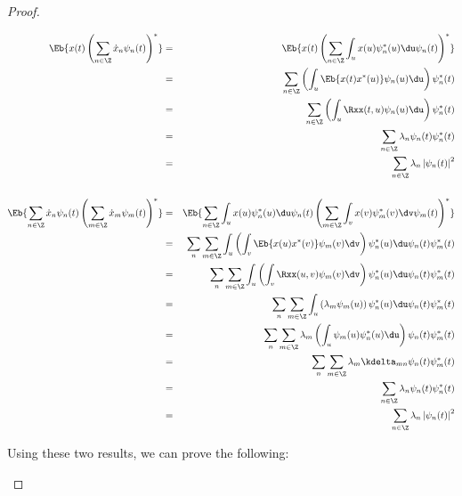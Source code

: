 \begin{proof}
\begin{enumerate}
\begin{eqnarray*}
   \Eb{x(t) \left(\sum_{n\in\Z}\dot{x}_n \psi_n(t)\right)^\ast}
     &=& \Eb{x(t) \left(\sum_{n\in\Z}\int_u x(u)\psi_n^\ast(u)\du \psi_n(t)\right)^\ast}
   \\&=&  \sum_{n\in\Z}\left(\int_u \Eb{x(t)x^\ast(u)}\psi_n(u)\du\right) \psi_n^\ast(t)
   \\&=&  \sum_{n\in\Z}\left(\int_u \Rxx(t,u)\psi_n(u)\du\right) \psi_n^\ast(t)
   \\&=&  \sum_{n\in\Z}\lambda_n\psi_n(t) \psi_n^\ast(t)
   \\&=&  \sum_{n\in\Z}\lambda_n \left|\psi_n(t) \right|^2
\\ \\
   \Eb{\sum_{n\in\Z}\dot{x}_n \psi_n(t)\left(\sum_{m\in\Z}\dot{x}_m \psi_m(t)\right)^\ast}
     &=& \Eb{\sum_{n\in\Z}\int_u x(u)\psi_n^\ast(u)\du   \psi_n(t)\left(\sum_{m\in\Z}\int_v x(v)\psi_m^\ast(v)\dv \psi_m(t)\right)^\ast}
   \\&=& \sum_n\sum_{m\in\Z}\int_u\left(\int_v \Eb{x(u)x^\ast(v)}\psi_m(v)\dv\right) \psi_n^\ast(u)\du   \psi_n(t)   \psi_m^\ast(t)
   \\&=& \sum_n\sum_{m\in\Z}\int_u\left(\int_v \Rxx(u,v)\psi_m(v)\dv\right) \psi_n^\ast(u)\du   \psi_n(t)   \psi_m^\ast(t)
   \\&=& \sum_n\sum_{m\in\Z}\int_u\left(\lambda_m\psi_m(u)\right) \psi_n^\ast(u)\du   \psi_n(t)   \psi_m^\ast(t)
   \\&=& \sum_n\sum_{m\in\Z}\lambda_m \left(\int_u \psi_m(u) \psi_n^\ast(u)\du \right)   \psi_n(t)   \psi_m^\ast(t)
   \\&=& \sum_n\sum_{m\in\Z}\lambda_m \kdelta_{mn}   \psi_n(t)   \psi_m^\ast(t)
   \\&=& \sum_{n\in\Z}\lambda_n   \psi_n(t)   \psi_n^\ast(t)
   \\&=& \sum_{n\in\Z}\lambda_n  \left| \psi_n(t) \right|^2
\end{eqnarray*}


Using these two results, we can prove the following:


\end{enumerate}
\end{proof}

